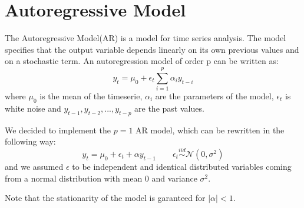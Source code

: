 \chapter{Autoregressive Model}
\label{AR}
The Autoregressive Model(AR) is a model for time series analysis. The model specifies that the output variable depends 
linearly on its own previous values and on a stochastic term. An autoregression model of order p can be written as:
\begin{equation}
    y_{t}=\mu_{0}+\epsilon_t \sum^{p}_{i=1}\alpha_{i} y_{t-i}
\end{equation}
where $\mu_{0}$ is the mean of the timeserie, $\alpha_{i}$ are the parameters of the model, $\epsilon_{t}$ is white noise and $y_{t-1}, y_{t-2}, ..., y_{t-p}$ are the past values.

We decided to implement the $p=1$ AR model, which can be rewritten in the following way:
\begin{equation}
    \label{AR_q1}
    y_{t}=\mu_{0}+\epsilon_t +\alpha y_{t-1} \qquad 
    \epsilon_t \stackrel{iid}{\sim} \mathcal{N}(0,\sigma^2)
\end{equation}
and we assumed $\epsilon$ to be independent and identical distributed variables coming from a normal distribution with mean $0$ and variance $\sigma^2$.

Note that the stationarity of the model is garanteed for $|\alpha|<1$.

